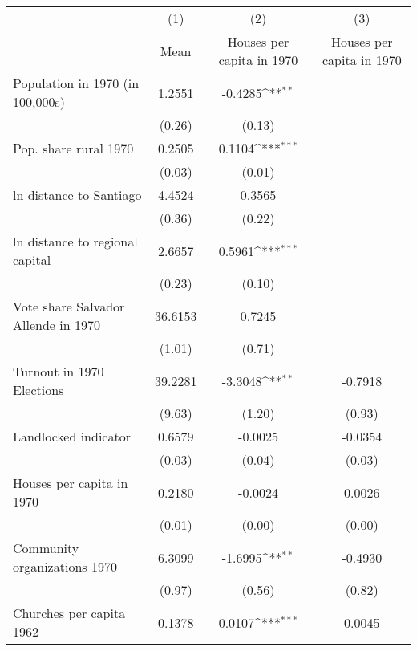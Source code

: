 {
\def\sym#1{\ifmmode^{#1}\else\(^{#1}\)\fi}
\begin{tabular}{l*{3}{c}}
\hline\hline
                    &\multicolumn{1}{c}{(1)}&\multicolumn{1}{c}{(2)}&\multicolumn{1}{c}{(3)}\\
                    &\multicolumn{1}{c}{Mean}&\multicolumn{1}{c}{Houses per capita in 1970}&\multicolumn{1}{c}{Houses per capita in 1970}\\
\hline
Population in 1970 (in 100,000s)&      1.2551 &     -0.4285\sym{**} &\\
                    &      (0.26)         &      (0.13)         &\\
Pop. share rural 1970&      0.2505 &      0.1104\sym{***}&\\
                    &      (0.03)         &      (0.01)   &      \\
ln distance to Santiago&      4.4524 &      0.3565         &\\
                    &      (0.36)         &      (0.22)     &    \\
ln distance to regional capital&      2.6657 &      0.5961\sym{***}&\\
                    &      (0.23)         &      (0.10)         &\\
Vote share Salvador Allende in 1970&     36.6153 &      0.7245   &      \\
                    &      (1.01)         &      (0.71)         \\
Turnout in 1970 Elections&     39.2281 &     -3.3048\sym{**} &     -0.7918         \\
                    &      (9.63)         &      (1.20)         &      (0.93)         \\
Landlocked indicator&      0.6579 &     -0.0025         &     -0.0354         \\
                    &      (0.03)         &      (0.04)         &      (0.03)         \\
Houses per capita in 1970&      0.2180 &     -0.0024         &      0.0026         \\
                    &      (0.01)         &      (0.00)         &      (0.00)         \\
Community organizations 1970&      6.3099 &     -1.6995\sym{**} &     -0.4930         \\
                    &      (0.97)         &      (0.56)         &      (0.82)         \\
Churches per capita 1962&      0.1378 &      0.0107\sym{***}&      0.0045         \\

\end{tabular}}
